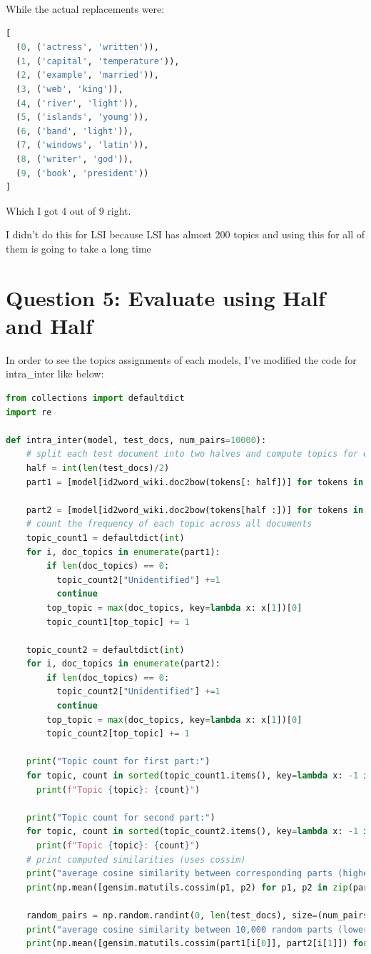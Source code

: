 \documentclass[a4paper]{article}
\begin{document}
While the actual replacements were:

\begin{lstlisting}[language=python]
[
  (0, ('actress', 'written')),
  (1, ('capital', 'temperature')),
  (2, ('example', 'married')),
  (3, ('web', 'king')),
  (4, ('river', 'light')),
  (5, ('islands', 'young')),
  (6, ('band', 'light')),
  (7, ('windows', 'latin')),
  (8, ('writer', 'god')),
  (9, ('book', 'president'))
]
\end{lstlisting}

Which I got 4 out of 9 right.

I didn't do this for LSI because LSI has almost 200 topics and using this for
all of them is going to take a long time

\section{Question 5: Evaluate using Half and Half}
In order to see the topics assignments of each models, I've modified the code
for intra\_inter like below:

\begin{lstlisting}[language=python]
from collections import defaultdict
import re

def intra_inter(model, test_docs, num_pairs=10000):
    # split each test document into two halves and compute topics for each half
    half = int(len(test_docs)/2)
    part1 = [model[id2word_wiki.doc2bow(tokens[: half])] for tokens in test_docs]

    part2 = [model[id2word_wiki.doc2bow(tokens[half :])] for tokens in test_docs]
    # count the frequency of each topic across all documents
    topic_count1 = defaultdict(int)
    for i, doc_topics in enumerate(part1):
        if len(doc_topics) == 0:
          topic_count2["Unidentified"] +=1
          continue
        top_topic = max(doc_topics, key=lambda x: x[1])[0]
        topic_count1[top_topic] += 1

    topic_count2 = defaultdict(int)
    for i, doc_topics in enumerate(part2):
        if len(doc_topics) == 0:
          topic_count2["Unidentified"] +=1
          continue
        top_topic = max(doc_topics, key=lambda x: x[1])[0]
        topic_count2[top_topic] += 1

    print("Topic count for first part:")
    for topic, count in sorted(topic_count1.items(), key=lambda x: -1 if isinstance(x[0], str) else x[0]):
      print(f"Topic {topic}: {count}")

    print("Topic count for second part:")
    for topic, count in sorted(topic_count2.items(), key=lambda x: -1 if isinstance(x[0], str) else x[0]):
      print(f"Topic {topic}: {count}")
    # print computed similarities (uses cossim)
    print("average cosine similarity between corresponding parts (higher is better):")
    print(np.mean([gensim.matutils.cossim(p1, p2) for p1, p2 in zip(part1, part2)]))

    random_pairs = np.random.randint(0, len(test_docs), size=(num_pairs, 2))
    print("average cosine similarity between 10,000 random parts (lower is better):")
    print(np.mean([gensim.matutils.cossim(part1[i[0]], part2[i[1]]) for i in random_pairs]))
\end{lstlisting}
\end{document}
